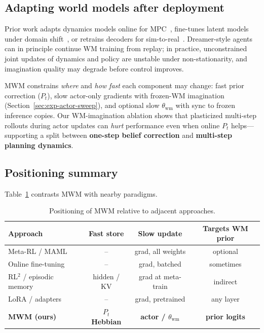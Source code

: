 \subsection{Adapting world models after deployment}
\label{sec:related-wm-adapt}

Prior work adapts dynamics models online for MPC~\cite{nagabandi2018learning,chua2018deep}, fine-tunes latent models under domain shift~\cite{hansen2022temporal}, or retrains decoders for sim-to-real~\cite{openai2018learning}.
Dreamer-style agents can in principle continue WM training from replay; in practice, unconstrained joint updates of dynamics and policy are unstable under non-stationarity, and imagination quality may degrade before control improves.

MWM constrains \emph{where} and \emph{how fast} each component may change:
fast prior correction ($P_t$), slow actor-only gradients with frozen-WM imagination (Section~\ref{sec:exp-actor-sweep}), and optional slow $\theta_{\mathrm{wm}}$ with sync to frozen inference copies.
Our WM-imagination ablation shows that plasticized multi-step rollouts during actor updates can \emph{hurt} performance even when online $P_t$ helps---supporting a split between \textbf{one-step belief correction} and \textbf{multi-step planning dynamics}.

\subsection{Positioning summary}
\label{sec:related-summary}

Table~\ref{tab:related-positioning} contrasts MWM with nearby paradigms.

\begin{table}[t]
  \centering
  \caption{Positioning of MWM relative to adjacent approaches.}
  \label{tab:related-positioning}
  \small
  \begin{tabular}{@{}lccc@{}}
    \toprule
    Approach & Fast store & Slow update & Targets WM prior \\
    \midrule
    Meta-RL / MAML~\cite{finn2017model} & -- & grad, all weights & optional \\
    Online fine-tuning~\cite{nagabandi2018learning,zintgraf2021fast} & -- & grad, batched & sometimes \\
    RL$^2$ / episodic memory~\cite{duan2016rl,pritzel2017neural} & hidden / KV & grad at meta-train & indirect \\
    LoRA / adapters~\cite{hu2022lora,houlsby2019parameter} & -- & grad, pretrained & any layer \\
    \textbf{MWM (ours)} & \textbf{$P_t$ Hebbian} & \textbf{actor / $\theta_{\mathrm{wm}}$} & \textbf{prior logits} \\
    \bottomrule
  \end{tabular}
\end{table}

